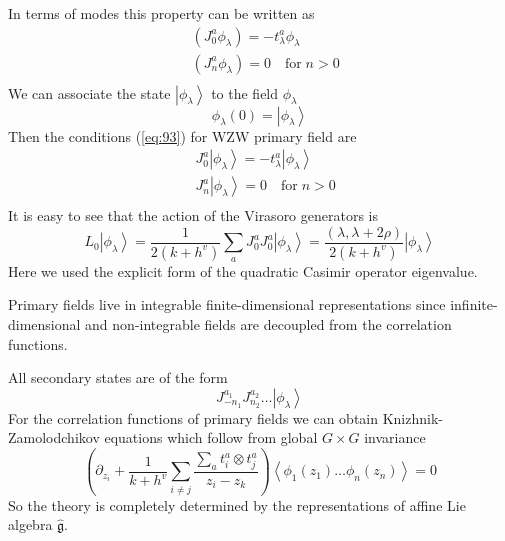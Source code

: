 \documentclass[a4paper,12pt]{article}
\theoremstyle{definition} \newtheorem{Def}{Definition}
\begin{document}
In terms of modes this property can be written as
\begin{equation}
  \label{eq:93}
  \begin{aligned}
    & (J_0^a \phi_{\lambda})=-t^a_{\lambda}\phi_{\lambda}\\
    & (J^a_n\phi_{\lambda})=0\quad \mbox{for}\; n>0\\
  \end{aligned}
\end{equation}
We can associate the state $\left|\phi_{\lambda}\right>$ to the field $\phi_{\lambda}$
  \begin{equation}
    \label{eq:94}
    \phi_{\lambda}(0)=\left|\phi_{\lambda}\right>
  \end{equation}
Then the conditions (\ref{eq:93}) for WZW primary field are
\begin{equation}
  \label{eq:95}
  \begin{aligned}
    & J_0^a\left|\phi_{\lambda}\right>=-t^a_{\lambda}\left|\phi_{\lambda}\right>\\
    & J^a_n\left|\phi_{\lambda}\right>=0 \quad \mbox{for}\; n>0 \\
  \end{aligned}
\end{equation}
It is easy to see that the action of the Virasoro generators is
\begin{equation}
  \label{eq:96}
  L_0\left|\phi_{\lambda}\right>=\frac{1}{2(k+h^v)}\sum_aJ^a_0J^a_0\left|\phi_{\lambda}\right>=\frac{(\lambda,\lambda+2\rho)}{2(k+h^v)}\left|\phi_{\lambda}\right>
\end{equation}
Here we used the explicit form of the quadratic Casimir operator eigenvalue.


Primary fields live in integrable finite-dimensional representations since infinite-dimensional and non-integrable fields are decoupled from the correlation functions.

All secondary states are of the form
\begin{equation}
  \label{eq:97}
  J^{a_1}_{-n_1}J^{a_2}_{n_2}\dots\left|\phi_{\lambda}\right>
\end{equation}
For the correlation functions of primary fields we can obtain Knizhnik-Zamolodchikov equations which follow from global $G\times G$ invariance
\begin{equation}
  \label{eq:98}
  \left(\partial_{z_i}+\frac{1}{k+h^v}\sum_{i\neq j}\frac{\sum_a t^a_i\otimes t^a_j}{z_i-z_k}\right)
  \left<\phi_1(z_1)\dots \phi_n(z_n)\right>=0
\end{equation}
So the theory is completely determined by the representations of affine Lie algebra $\hat{\mathfrak{g}} $.
\end{document}
